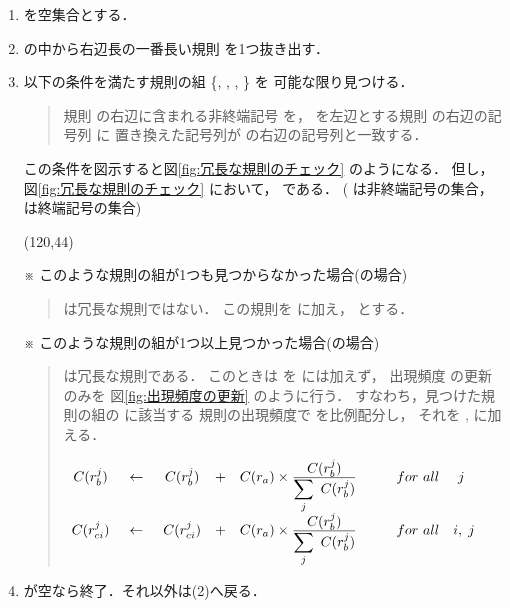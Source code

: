 \begin{enumerate}
\item
   を空集合とする．

\item
   の中から右辺長の一番長い規則  を1つ抜き出す．

\item
  以下の条件を満たす規則の組
  \{, , , \} を
  可能な限り見つける．
  \begin{quote}
    規則 の右辺に含まれる非終端記号 を，
     を左辺とする規則 の右辺の記号列 に
    置き換えた記号列が の右辺の記号列と一致する．
  \end{quote}

  この条件を図示すると図\ref{fig:冗長な規則のチェック} のようになる．
  但し，図\ref{fig:冗長な規則のチェック} において，
  である．
  ( は非終端記号の集合， は終端記号の集合)

  \bigskip
  \begin{center}
    \atari(120,44)
  \end{center}

  ※ このような規則の組が1つも見つからなかった場合(の場合)
  \begin{quote}
     は冗長な規則ではない．
    この規則を  に加え， とする．
  \end{quote}
  ※ このような規則の組が1つ以上見つかった場合(の場合)
  \begin{quote}
     は冗長な規則である．
    このときは  を  には加えず，
    出現頻度  の更新のみを
    図\ref{fig:出現頻度の更新} のように行う．
    すなわち，見つけた規則の組の  に該当する
    規則の出現頻度で  を比例配分し，
    それを ,  に加える．

    \bigskip
    \begin{center} $
      \begin{array}{c@{\hspace*{5mm}}c@{\hspace*{5mm}}ccc@{\hspace*{10mm}}l}
        C(r_b^j)    & \leftarrow & C(r_b^j)    & + &
          C(r_a) \times \frac{\displaystyle C(r_b^j)}
                             {\displaystyle \sum_j ~ C(r_b^j)} &
          for ~ all ~~~~ j \\[5mm]
        C(r_{ci}^j) & \leftarrow & C(r_{ci}^j) & + &
          C(r_a) \times \frac{\displaystyle C(r_b^j)}
                             {\displaystyle \sum_j ~ C(r_b^j)} &
          for ~ all ~~~ i, \; j \\
      \end{array} $
      \bigskip
    \end{center}
  \end{quote}

\item
   が空なら終了．それ以外は(2)へ戻る．
\end{enumerate}

